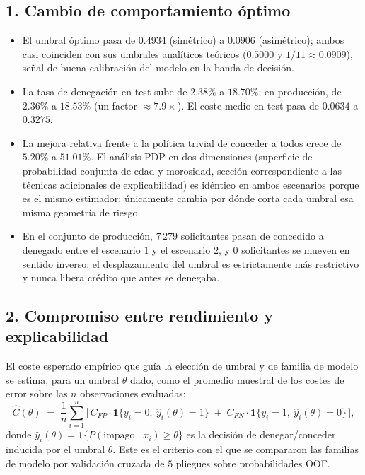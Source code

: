 \documentclass[11pt,a4paper]{article}
\begin{document}
\subsection*{1. Cambio de comportamiento \'optimo}

\begin{itemize}
\item El umbral \'optimo pasa de $0.4934$ (sim\'etrico) a $0.0906$ (asim\'etrico); ambos casi coinciden con
sus umbrales anal\'iticos te\'oricos ($0.5000$ y $1/11\approx0.0909$), se\~nal de buena calibraci\'on del
modelo en la banda de decisi\'on.
\item La tasa de denegaci\'on en test sube de $2.38\%$ a $18.70\%$; en producci\'on, de $2.36\%$ a
$18.53\%$ (un factor $\approx 7.9\times$). El coste medio en test pasa de $0.0634$ a $0.3275$.
\item La mejora relativa frente a la pol\'itica trivial de conceder a todos crece de $5.20\%$ a $51.01\%$.
El an\'alisis PDP en dos dimensiones (superficie de probabilidad conjunta de edad y morosidad, secci\'on
correspondiente a las t\'ecnicas adicionales de explicabilidad) es id\'entico en ambos escenarios porque es
el mismo estimador; \'unicamente cambia por d\'onde corta cada umbral esa misma geometr\'ia de riesgo.
\item En el conjunto de producci\'on, $7\,279$ solicitantes pasan de concedido a denegado entre el
escenario $1$ y el escenario $2$, y $0$ solicitantes se mueven en sentido inverso: el desplazamiento del
umbral es estrictamente m\'as restrictivo y nunca libera cr\'edito que antes se denegaba.
\end{itemize}

\subsection*{2. Compromiso entre rendimiento y explicabilidad}

El coste esperado emp\'irico que gu\'ia la elecci\'on de umbral y de familia de modelo se estima, para un
umbral $\theta$ dado, como el promedio muestral de los costes de error sobre las $n$ observaciones
evaluadas:
\[
\hat{C}(\theta) \;=\; \frac{1}{n}\sum_{i=1}^{n}
\Big[\, C_{FP}\cdot\mathbf{1}\{y_i=0,\ \hat{y}_i(\theta)=1\} \;+\; C_{FN}\cdot\mathbf{1}\{y_i=1,\ \hat{y}_i(\theta)=0\} \,\Big],
\]
donde $\hat{y}_i(\theta)=\mathbf{1}\{P(\text{impago}\mid x_i)\geq\theta\}$ es la decisi\'on de denegar/conceder
inducida por el umbral $\theta$. Este es el criterio con el que se compararon las familias de modelo por
validaci\'on cruzada de $5$ pliegues sobre probabilidades OOF.
\end{document}
